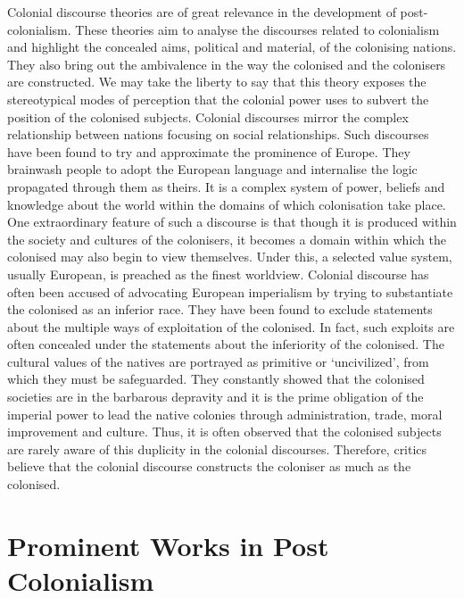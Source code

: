 Colonial  discourse  theories  are  of  great  relevance  in  the  development  of  post-colonialism.  These  theories  aim  to  analyse  the  discourses  related  to  colonialism  and  highlight  the  concealed  aims,  political  and  material,  of  the  colonising  nations.  They  also  bring  out  the  ambivalence  in  the  way  the  colonised  and  the  colonisers  are  constructed.  We  may  take  the  liberty  to  say  that  this  theory  exposes  the  stereotypical  modes  of  perception  that  the  colonial  power  uses  to  subvert  the  position  of  the  colonised  subjects.  Colonial  discourses  mirror  the  complex  relationship  between  nations  focusing  on  social  relationships.  Such  discourses  have  been  found  to  try  and  approximate  the  prominence  of  Europe.  They  brainwash  people  to  adopt  the  European  language  and  internalise  the  logic  propagated  through  them  as  theirs.    It  is  a  complex  system  of  power,  beliefs  and  knowledge  about  the  world  within  the  domains  of  which  colonisation  take  place.  One  extraordinary  feature  of  such  a  discourse  is  that  though  it  is  produced  within  the  society  and  cultures  of  the  colonisers,  it  becomes  a  domain  within  which  the  colonised  may  also  begin  to  view  themselves.  Under  this,  a  selected  value  system,  usually  European,  is  preached  as  the  finest  worldview.  Colonial  discourse  has  often  been  accused  of  advocating  European  imperialism  by  trying  to  substantiate  the  colonised  as  an  inferior  race.  They  have  been  found  to  exclude  statements  about  the  multiple  ways  of  exploitation  of  the  colonised.  In  fact,  such  exploits  are  often  concealed  under  the  statements  about  the  inferiority  of  the  colonised.  The  cultural  values  of  the  natives  are  portrayed  as  primitive  or  ‘uncivilized’,  from  which  they  must  be  safeguarded.  They  constantly  showed  that  the  colonised  societies  are  in  the  barbarous  depravity  and  it  is  the  prime  obligation  of  the  imperial  power  to  lead  the  native  colonies  through  administration,  trade,  moral  improvement  and  culture.  Thus,  it  is  often  observed  that  the  colonised  subjects  are  rarely  aware  of  this  duplicity  in  the  colonial  discourses.  Therefore,  critics  believe  that  the  colonial  discourse  constructs  the  coloniser  as  much  as  the  colonised.

\section{Prominent Works in Post Colonialism}

